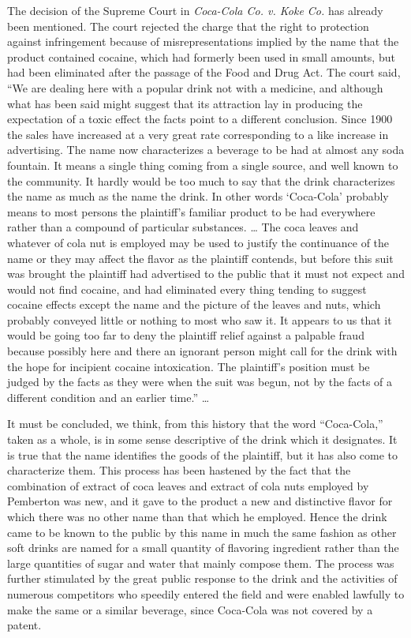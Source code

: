 The decision of the Supreme Court in \textit{Coca-Cola Co. v. Koke Co.} has
already been mentioned. The court rejected the charge that the right to
protection against infringement because of misrepresentations implied by the
name that the product contained cocaine, which had formerly been used in small
amounts, but had been eliminated after the passage of the Food and Drug Act.
The court said, ``We are dealing here with a popular drink not with a medicine,
and although what has been said might suggest that its attraction lay in
producing the expectation of a toxic effect the facts point to a different
conclusion. Since 1900 the sales have increased at a very great rate
corresponding to a like increase in advertising. The name now characterizes a
beverage to be had at almost any soda fountain. It means a single thing coming
from a single source, and well known to the community. It hardly would be too
much to say that the drink characterizes the name as much as the name the
drink. In other words `Coca-Cola' probably means to most persons the
plaintiff's familiar product to be had everywhere rather than a compound of
particular substances. {\dots} The coca leaves and whatever of cola nut is
employed may be used to justify the continuance of the name or they may affect
the flavor as the plaintiff contends, but before this suit was brought the
plaintiff had advertised to the public that it must not expect and would not
find cocaine, and had eliminated every thing tending to suggest cocaine effects
except the name and the picture of the leaves and nuts, which probably conveyed
little or nothing to most who saw it. It appears to us that it would be going
too far to deny the plaintiff relief against a palpable fraud because possibly
here and there an ignorant person might call for the drink with the hope for
incipient cocaine intoxication. The plaintiff's position must be judged by the
facts as they were when the suit was begun, not by the facts of a different
condition and an earlier time.'' {\dots}

It must be concluded, we think, from this history that the word ``Coca-Cola,''
taken as a whole, is in some sense descriptive of the drink which it
designates. It is true that the name identifies the goods of the plaintiff, but
it has also come to characterize them. This process has been hastened by the
fact that the combination of extract of coca leaves and extract of cola nuts
employed by Pemberton was new, and it gave to the product a new and distinctive
flavor for which there was no other name than that which he employed. Hence the
drink came to be known to the public by this name in much the same fashion as
other soft drinks are named for a small quantity of flavoring ingredient rather
than the large quantities of sugar and water that mainly compose them. The
process was further stimulated by the great public response to the drink and
the activities of numerous competitors who speedily entered the field and were
enabled lawfully to make the same or a similar beverage, since Coca-Cola was
not covered by a patent.

